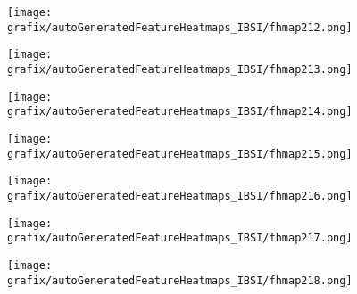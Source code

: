 \hspace{\hsp} 
\begin{subfigure}{\wid\textwidth} 
    \centering 
    \caption{\tiny \sffamily {}} 
    \vspace{\vsp} 
    \texttt{[image: grafix/autoGeneratedFeatureHeatmaps\_IBSI/fhmap212.png]} 
\end{subfigure} 
\hspace{\hsp} 
\begin{subfigure}{\wid\textwidth} 
    \centering 
    \caption{\tiny \sffamily {}} 
    \vspace{\vsp} 
    \texttt{[image: grafix/autoGeneratedFeatureHeatmaps\_IBSI/fhmap213.png]} 
\end{subfigure} 
\hspace{\hsp} 
\begin{subfigure}{\wid\textwidth} 
    \centering 
    \caption{\tiny \sffamily {}} 
    \vspace{\vsp} 
    \texttt{[image: grafix/autoGeneratedFeatureHeatmaps\_IBSI/fhmap214.png]} 
\end{subfigure} 
\hspace{\hsp} 
\begin{subfigure}{\wid\textwidth} 
    \centering 
    \caption{\tiny \sffamily {}} 
    \vspace{\vsp} 
    \texttt{[image: grafix/autoGeneratedFeatureHeatmaps\_IBSI/fhmap215.png]} 
\end{subfigure} 
\hspace{\hsp} 
\begin{subfigure}{\wid\textwidth} 
    \centering 
    \caption{\tiny \sffamily {}} 
    \vspace{\vsp} 
    \texttt{[image: grafix/autoGeneratedFeatureHeatmaps\_IBSI/fhmap216.png]} 
\end{subfigure} 
\hspace{\hsp} 
\begin{subfigure}{\wid\textwidth} 
    \centering 
    \caption{\tiny \sffamily {}} 
    \vspace{\vsp} 
    \texttt{[image: grafix/autoGeneratedFeatureHeatmaps\_IBSI/fhmap217.png]} 
\end{subfigure} 
\hspace{\hsp} 
\begin{subfigure}{\wid\textwidth} 
    \centering 
    \caption{\tiny \sffamily {}} 
    \vspace{\vsp} 
    \texttt{[image: grafix/autoGeneratedFeatureHeatmaps\_IBSI/fhmap218.png]} 
\end{subfigure} 
